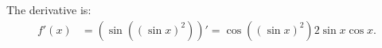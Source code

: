 
    The derivative is:
    \begin{align*}
        f'(x) & = \left( \sin((\sin x)^2) \right)'
        =\cos((\sin x)^2) 2\sin x \cos x.
    \end{align*}
